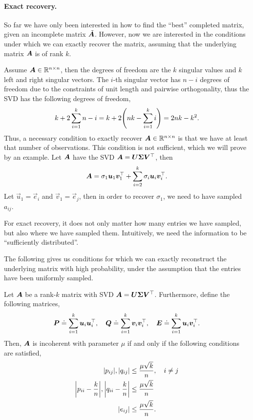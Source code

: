 \paragraph{Exact recovery.}

So far we have only been interested in how to find the ``best'' completed matrix, given an
incomplete matrix $\tilde{\bm{A}}$. However, now we are interested in the conditions under which
we can exactly recover the matrix, assuming that the underlying matrix $\bm{A}$ is of rank $k$.

Assume $\bm{A} \in \mathbb{R}^{n \times n}$, then the degrees of freedom are the $k$ singular values and
$k$ left and right singular vectors. The $i$-th singular vector has $n-i$ degrees of freedom due to
the constraints of unit length and pairwise orthogonality, thus the SVD has the following degrees
of freedom, \[
    k + 2\sum_{i=1}^{k} n - i = k + 2 \lft( nk - \sum_{i=1}^{k} i \rgt) = 2nk - k^2.
\]
Thus, a necessary condition to exactly recover $\bm{A} \in \mathbb{R}^{n\times n}$ is that we have at
least that number of observations. This condition is not sufficient, which we will prove by an
example. Let $\bm{A}$ have the SVD $\bm{A} = \bm{U} \bm{\Sigma} \bm{V}^\top$, then \[
    \bm{A} = \sigma_1 \bm{u}_1 \bm{v}_1^\top + \sum_{i=2}^{k} \sigma_i \bm{u}_i \bm{v}_i^\top.
\]
Let $\vec{u}_1 = \vec{e}_i$ and $\vec{v}_1 = \vec{e}_j$, then in order to recover $\sigma_1$, we
need to have sampled $a_{ij}$.

\begin{important}
    For exact recovery, it does not only matter how many entries we have sampled, but
    also where we have sampled them. Intuitively, we need the information to be ``sufficiently
    distributed''.
\end{important}

The following gives us conditions for which we can exactly reconstruct the underlying matrix with
high probability, under the assumption that the entries have been uniformly sampled.

\begin{definition}[Incoherence]
    Let $\bm{A}$ be a rank-$k$ matrix with SVD $\bm{A} = \bm{U} \bm{\Sigma} \bm{V}^\top$.
    Furthermore, define the following matrices, \[
        \bm{P} \doteq \sum_{i=1}^{k} \bm{u}_i \bm{u}_i^\top, \quad \bm{Q} \doteq \sum_{i=1}^{k} \bm{v}_i \bm{v}_i^\top, \quad \bm{E} \doteq \sum_{i=1}^{k} \bm{u}_i \bm{v}_i^\top.
    \]
    Then, $\bm{A}$ is incoherent with parameter $\mu$ if and only if the following conditions are
    satisfied,
    \begin{align*}
        |p_{ij}|, |q_{ij}|                                                 & \leq \frac{\mu \sqrt{k}}{n}, \quad i \neq j \\
        \lft| p_{ii} - \frac{k}{n} \rgt|, \lft| q_{ii} - \frac{k}{n} \rgt| & \leq \frac{\mu \sqrt{k}}{n}                 \\
        |e_{ij}|                                                           & \leq \frac{\mu \sqrt{k}}{n}.
    \end{align*}
\end{definition}

